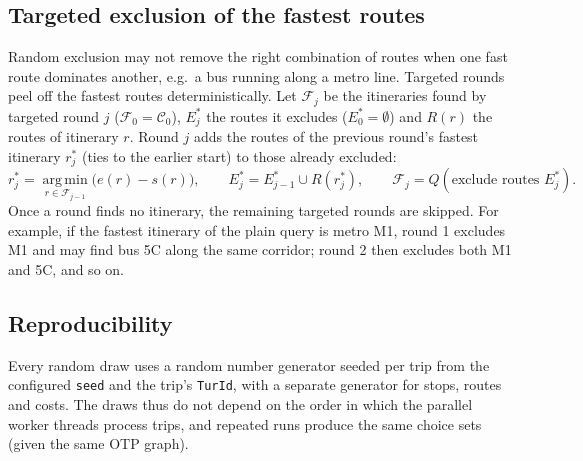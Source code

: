 \documentclass[11pt,a4paper]{article}
\newcommand{\code}[1]{\texttt{#1}}
\newcommand{\cand}{\mathcal{C}}
\begin{document}
\subsection{Targeted exclusion of the fastest routes}
Random exclusion may not remove the right combination of routes when one fast route dominates
another, e.g.\ a bus running along a metro line. Targeted rounds peel off the fastest routes
deterministically. Let $\mathcal{F}_j$ be the itineraries found by targeted round $j$
($\mathcal{F}_0 = \cand_0$), $E^*_j$ the routes it excludes ($E^*_0 = \emptyset$) and $R(r)$ the routes
of itinerary $r$. Round $j$ adds the routes of the previous round's fastest itinerary $r^*_j$ (ties to
the earlier start) to those already excluded:
\begin{equation}
  r^*_j = \operatorname*{arg\,min}_{r \in \mathcal{F}_{j-1}} \bigl(e(r) - s(r)\bigr), \qquad
  E^*_j = E^*_{j-1} \cup R(r^*_j), \qquad
  \mathcal{F}_j = Q(\text{exclude routes } E^*_j).
\end{equation}
Once a round finds no itinerary, the remaining targeted rounds are skipped.
For example, if the fastest itinerary of the plain query is metro M1, round 1 excludes M1 and may find bus 5C along the same corridor; round 2 then excludes both M1 and 5C, and so on.

\subsection{Reproducibility}

Every random draw uses a random number generator seeded per trip from the configured \code{seed} and the trip's \code{TurId}, with a separate generator for stops, routes and costs. The draws thus do not depend on the order in which the parallel worker threads process trips, and repeated runs produce the same choice sets (given the same OTP graph).
\end{document}
